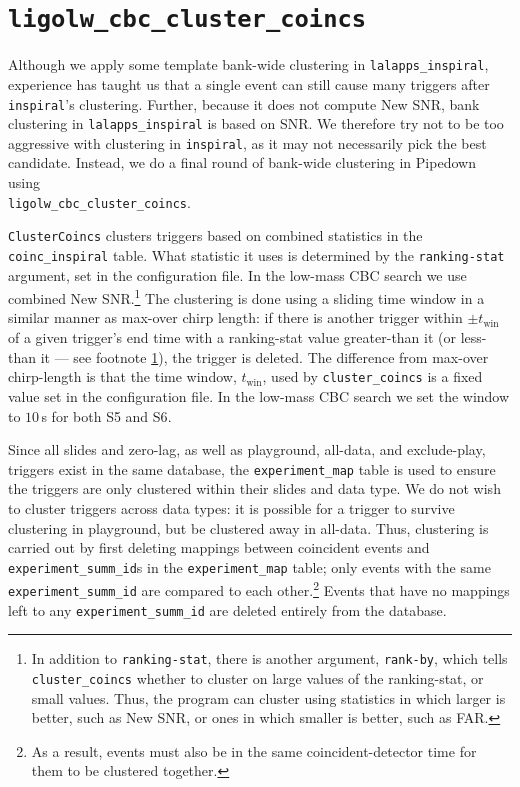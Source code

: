 \section{\texttt{ligolw\_cbc\_cluster\_coincs}}

Although we apply some template bank-wide clustering in \verb|lalapps_inspiral|,
experience has taught us that a single event can still cause many triggers
after \verb|inspiral|'s clustering. Further, because it does not compute New
\ac{SNR}, bank clustering in \verb|lalapps_inspiral| is based on \ac{SNR}. We
therefore try not to be too aggressive with clustering in \verb|inspiral|, as it
may not necessarily pick the best candidate. Instead, we do a final round of
bank-wide clustering in Pipedown using \\ \verb|ligolw_cbc_cluster_coincs|.

\verb|ClusterCoincs| clusters triggers based on combined statistics in the \\
\verb|coinc_inspiral| table. What statistic it uses is determined by the
\verb|ranking-stat| argument, set in the configuration file. In the low-mass
\ac{CBC} search we use combined New \ac{SNR}.\footnote{\label{ftnt:ranking_by}
In addition to \texttt{ranking-stat}, there is another argument,
\texttt{rank-by}, which tells \texttt{cluster\_coincs} whether to cluster on
large values of the ranking-stat, or small values. Thus, the program can
cluster using statistics in which larger is better, such as New \ac{SNR}, or
ones in which smaller is better, such as \ac{FAR}.} The clustering is done
using a sliding time window in a similar manner as max-over chirp length: if
there is another trigger within $\pm t_{\mathrm{win}}$ of a given trigger's end
time with a ranking-stat value greater-than it (or less-than it --- see
footnote \ref{ftnt:ranking_by}), the trigger is deleted. The difference from
max-over chirp-length is that the time window, $t_{\mathrm{win}}$, used by
\verb|cluster_coincs| is a fixed value set in the configuration file. In the
low-mass \ac{CBC} search we set the window to $10\,$s for both \ac{S5} and
\ac{S6}.

Since all slides and zero-lag, as well as playground, all-data, and
exclude-play, triggers exist in the same database, the \verb|experiment_map|
table is used to ensure the triggers are only clustered within their slides and
data type. We do not wish to cluster triggers across data types: it is possible
for a trigger to survive clustering in playground, but be clustered away in
all-data. Thus, clustering is carried out by first deleting mappings between
coincident events and \verb|experiment_summ_id|s in the \verb|experiment_map|
table; only events with the same \verb|experiment_summ_id| are compared to each
other.\footnote{As a result, events must also be in the same coincident-detector
time for them to be clustered together.} Events that have no mappings left to
any \verb|experiment_summ_id| are deleted entirely from the database.

